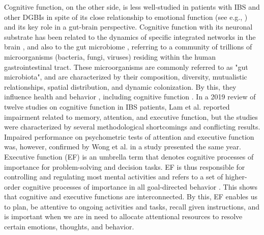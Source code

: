 \documentclass[jcm,article,submit,pdftex,moreauthors]{Definitions/mdpi}
\begin{document}
Cognitive function, on the other side, is less well-studied in patients with IBS and other DGBIs in spite of its close relationship to emotional function (see e.g., \cite{kriesche2022neurocognitive}) and its key role in a gut-brain perspective. Cognitive function with its neuronal substrate has been related to the dynamics of specific integrated networks in the brain \cite{Stuss2000, sporns2022structure, colom2022human}, and also to the gut microbiome \cite{salami2021interplay, tooley2020effects}, referring to a community of trillions of microorganisms (bacteria, fungi, viruses) residing within the human gastrointestinal tract. These microorganisms are commonly referred to as "gut microbiota", and are characterized by their composition, diversity, mutualistic relationships, spatial distribution, and dynamic colonization. By this, they influence health and behavior \cite{jarchum2011regulation}, including cognitive function \cite{tooley2020effects}.
In a 2019 review of twelve studies on cognitive function in IBS patients, Lam et al. \cite{lam2019cognitive}  reported impairment related to memory, attention, and executive function, but the  studies were characterized by several methodological shortcomings and conflicting results. Impaired performance on psychometric tests of attention and executive function was, however, confirmed by Wong et al. \cite{wong2019nature} in a study presented the same year. Executive function (EF) is an umbrella term that denotes cognitive processes of importance for problem-solving and decision tasks. EF is thus responsible for controlling and regulating most mental activities and refers to a set of higher-order cognitive processes of importance in all goal-directed behavior \cite{diamond2013, Gilbert2008}. This shows that cognitive and executive functions are interconnected. By this, EF enables us to plan, be attentive to ongoing activities and tasks, recall given instructions, and is important when we are in need to allocate attentional resources to resolve certain emotions, thoughts, and behavior.  
\end{document}
